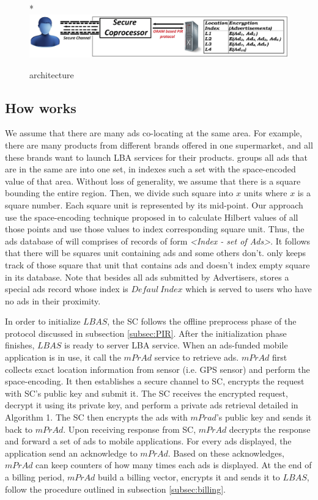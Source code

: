 \begin{figure}*
\includegraphics[scale=0.3]{figures/architecture_img.jpg}
\caption{\codename architecture}
\label{fig:architecture}
\end{figure}




\subsection{How \codename works}
We assume that there are many ads co-locating at the same area. For example, there are many products from different brands offered in one supermarket, and all these brands want to launch LBA services for their products. \codename groups all ads that are in the same are into one set, in indexes such a set with the space-encoded value of that area. Without loss of generality, we assume that there is a square bounding the entire region. Then, we divide such square into $x$ units where $x$ is a square number. Each square unit is represented by its mid-point. Our approach use the space-encoding technique proposed in \cite{Space_Transformation} to calculate Hilbert values of all those points and use those values to index corresponding square unit. Thus, the ads database of \codename will comprises of records of form \textit{<Index - set of Ads>}. It follows that there will be squares unit containing ads and some others don't. \codename only keeps track of those square that unit that contains ads and doesn't index empty square in its database. Note that besides all ads submitted by Advertisers, \codename stores a special ads record whose index is $Defaul\ Index$ which is served to users who have no ads in their proximity.


In order to initialize $LBAS$, the SC follows the offline preprocess phase of the protocol discussed in subsection \ref{subsec:PIR}. After the initialization phase finishes, $LBAS$ is ready to server LBA service.
When an ads-funded mobile application is in use, it call the $mPrAd$ service to retrieve ads. $mPrAd$ first collects exact location information from sensor (i.e. GPS sensor) and perform the space-encoding. It then establishes a secure channel to SC, encrypts the request with SC's public key and submit it. The SC receives the encrypted request, decrypt it using its private key, and perform a private ads retrieval detailed in Algorithm 1. The SC then encrypts the ads with $mPrad$'s public key and sends it back to $mPrAd$. Upon receiving response from SC, $mPrAd$ decrypts the response and forward a set of ads to mobile applications. For every ads displayed, the application send an acknowledge to $mPrAd$. Based on these acknowledges, $mPrAd$ can keep counters of how many times each ads is displayed. At the end of a billing period, $mPrAd$ build a billing vector, encrypts it and sends it to $LBAS$, follow the procedure outlined in subsection \ref{subsec:billing}.

